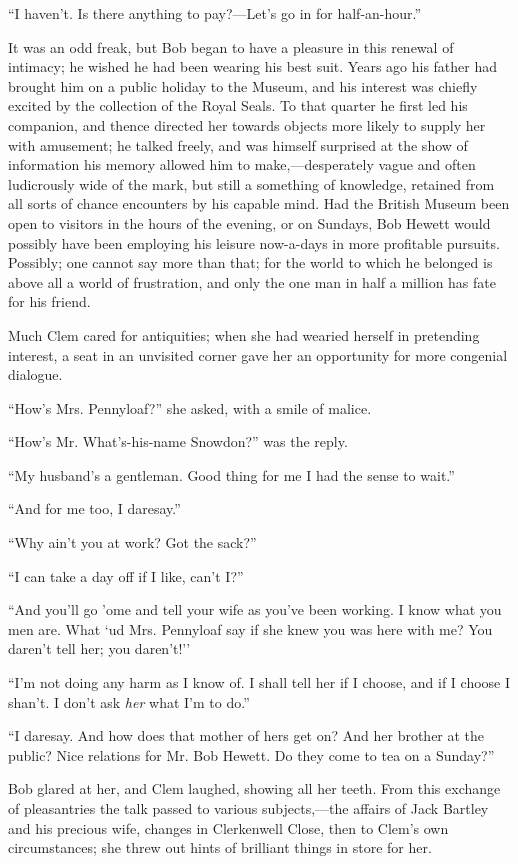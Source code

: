 {}``I haven't. Is there anything to pay?---Let's go in for
half-an-hour.''

It was an odd freak, but Bob began to have a pleasure in this renewal of
intimacy; he wished he had been wearing his best suit. Years ago his
father had brought him on a public holiday to the Museum, and his
interest was chiefly excited by the collection of the Royal Seals. To
that quarter he first led his companion, and thence directed her towards
objects more likely to supply her with amusement; he talked freely, and
was himself surprised at the show of information his memory allowed him
to make,---desperately vague and often ludicrously wide of the mark, but
still a something of knowledge, retained from all sorts of chance
encounters by his capable mind. Had the British Museum been open to
visitors in the hours of the evening, or on Sundays, Bob Hewett would
possibly have been employing his leisure now-a-days in more profitable
pursuits. Possibly; one cannot say more than that; for the world to
which he belonged is above all {}a world of frustration, and only the
one man in half a million has fate for his friend.

Much Clem cared for antiquities; when she had wearied herself in
pretending interest, a seat in an unvisited corner gave her an
opportunity for more congenial dialogue.

``How's Mrs. Pennyloaf?'' she asked, with a smile of malice.

``How's Mr. What's-his-name Snowdon?'' was the reply.

``My husband's a gentleman. Good thing for me I had the sense to wait.''

``And for me too, I daresay.''

``Why ain't you at work? Got the sack?''

``I can take a day off if I like, can't I?''

``And you'll go 'ome and tell your wife as you've been working. I know
what you men are. What `ud Mrs. Pennyloaf say if she knew you was here
with me? You daren't tell her; you daren't!''

``I'm not doing any harm as I know of. I shall tell her if I choose, and
if I choose I shan't. I don't ask \emph{her} what I'm to do.''

``I daresay. And how does that mother of {}hers get on? And her brother
at the public? Nice relations for Mr. Bob Hewett. Do they come to tea on
a Sunday?''

Bob glared at her, and Clem laughed, showing all her teeth. From this
exchange of pleasantries the talk passed to various subjects,---the
affairs of Jack Bartley and his precious wife, changes in Clerkenwell
Close, then to Clem's own circumstances; she threw out hints of
brilliant things in store for her.

